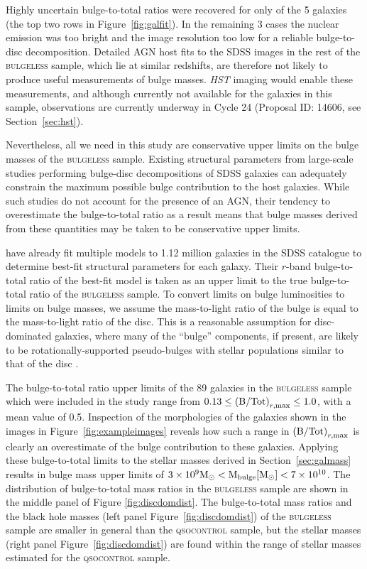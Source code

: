 {Highly uncertain bulge-to-total ratios were recovered for only {} of the 5 galaxies (the top two rows in Figure~\ref{fig:galfit}). In the remaining 3 cases the nuclear emission was too bright and the image resolution too low for a reliable bulge-to-disc decomposition.  Detailed AGN host fits to the SDSS images in the rest of the \textsc{bulgeless} sample, which lie at similar redshifts, are therefore not likely to produce useful measurements of bulge masses. \emph{HST} imaging would enable these measurements, and although currently not available for the galaxies in this sample, observations are currently underway in Cycle 24 (Proposal ID: 14606, see Section~\ref{sec:hst}). 

Nevertheless, all we need in this study are conservative upper limits on the bulge masses of the \textsc{bulgeless} sample. Existing structural parameters from large-scale studies performing bulge-disc decompositions of SDSS galaxies can adequately constrain the maximum possible bulge contribution to the host galaxies. While such studies do not account for the presence of an AGN, their tendency to overestimate the bulge-to-total ratio as a result means that bulge masses derived from these quantities may be taken to be conservative upper limits.

\citet{simard11} have already fit multiple models to 1.12 million galaxies in the SDSS catalogue to determine best-fit structural parameters for each galaxy. Their $r$-band bulge-to-total ratio {\notebsm of the best-fit model} is taken as an upper limit to the true bulge-to-total ratio of the \textsc{bulgeless} sample. To convert limits on bulge luminosities to limits on bulge masses, we assume the mass-to-light ratio of the bulge is equal to the mass-to-light ratio of the disc. This is a reasonable assumption for disc-dominated galaxies, where many of the ``bulge'' components, if present, are likely to be rotationally-supported pseudo-bulges \citep{kormendy04} with stellar populations similar to that of the disc {\notebsm \citep{graham01a}}.

The bulge-to-total ratio upper limits of the 89 galaxies in the \textsc{bulgeless} sample which were included in the \citet{simard11} study range from {\notebsm $0.13 \leq \left({\rm B/Tot}\right)_{r, \rm max} \leq 1.0$, with a mean value of 0.5}. Inspection of the morphologies of the galaxies shown in the images in Figure~\ref{fig:exampleimages} reveals how such a range in $\left({\rm B/Tot}\right)_{r, \rm max}$ is clearly an overestimate of the bulge contribution to these galaxies. Applying these bulge-to-total limits to the stellar masses derived in Section~\ref{sec:galmass} results in bulge mass upper limits of {\notebsm $3 \times 10^9 \rm{M}_{\odot} < \rm M_{\rm{bulge}}[\rm{M}_{\odot}] < 7 \times 10^{10} $}. The distribution of bulge-to-total mass ratios in the \textsc{bulgeless} sample are shown in the middle panel of Figure \ref{fig:discdomdist}. The bulge-to-total mass ratios and the black hole masses (left panel Figure~\ref{fig:discdomdist}) of the \textsc{bulgeless} sample are smaller in general than the \textsc{qsocontrol} sample, but the stellar masses (right panel Figure~\ref{fig:discdomdist}) are found within the range of stellar masses estimated for the \textsc{qsocontrol} sample. 

}
